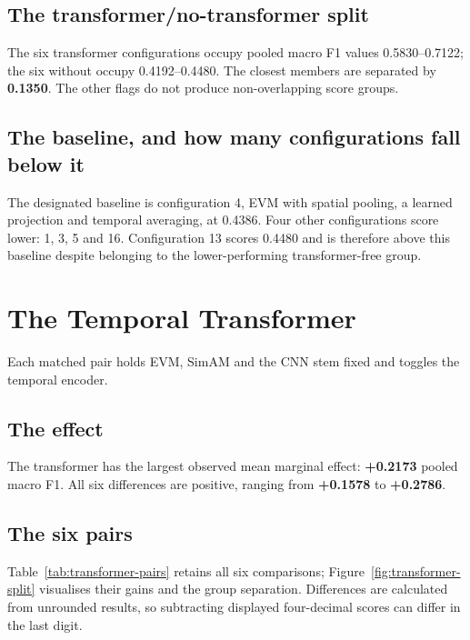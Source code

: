 \subsection{The transformer/no-transformer split}
\label{sec:transformer-split}

The six transformer configurations occupy pooled macro F1 values 0.5830--0.7122; the six without occupy 0.4192--0.4480. The closest members are separated by \textbf{0.1350}. The other flags do not produce non-overlapping score groups.

\subsection{The baseline, and how many configurations fall below it}
\label{sec:baseline-count}

The designated baseline is configuration 4, EVM with spatial pooling, a learned projection and temporal averaging, at 0.4386. Four other configurations score lower: 1, 3, 5 and 16. Configuration 13 scores 0.4480 and is therefore above this baseline despite belonging to the lower-performing transformer-free group.

\section{The Temporal Transformer}
\label{sec:transformer-results}

Each matched pair holds EVM, SimAM and the CNN stem fixed and toggles the temporal encoder.

\subsection{The effect}
\label{sec:transformer-effect}

The transformer has the largest observed mean marginal effect: \textbf{+0.2173} pooled macro F1. All six differences are positive, ranging from \textbf{+0.1578} to \textbf{+0.2786}.

\subsection{The six pairs}
\label{sec:transformer-six-pairs}

Table~\ref{tab:transformer-pairs} retains all six comparisons; Figure~\ref{fig:transformer-split} visualises their gains and the group separation. Differences are calculated from unrounded results, so subtracting displayed four-decimal scores can differ in the last digit.

